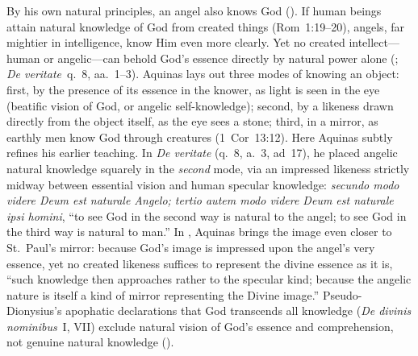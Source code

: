 By his own natural principles, an angel also knows God (). If human beings attain natural knowledge of God from created things (Rom~1:19--20), angels, far mightier in intelligence, know Him even more clearly. Yet no created intellect---human or angelic---can behold God's essence directly by natural power alone (; \emph{De veritate}~q.~8, aa.~1--3). Aquinas lays out three modes of knowing an object: first, by the presence of its essence in the knower, as light is seen in the eye (beatific vision of God, or angelic self-knowledge); second, by a likeness drawn directly from the object itself, as the eye sees a stone; third, in a mirror, as earthly men know God through creatures (1~Cor~13:12). Here Aquinas subtly refines his earlier teaching. In \emph{De veritate} (q.~8, a.~3, ad~17), he placed angelic natural knowledge squarely in the \emph{second} mode, via an impressed likeness strictly midway between essential vision and human specular knowledge: \emph{secundo modo videre Deum est naturale Angelo; tertio autem modo videre Deum est naturale ipsi homini}, ``to see God in the second way is natural to the angel; to see God in the third way is natural to man.'' In , Aquinas brings the image even closer to St.~Paul's mirror: because God's image is impressed upon the angel's very essence, yet no created likeness suffices to represent the divine essence as it is, ``such knowledge then approaches rather to the specular kind; because the angelic nature is itself a kind of mirror representing the Divine image.'' Pseudo-Dionysius's apophatic declarations that God transcends all knowledge (\emph{De divinis nominibus}~I, VII) exclude natural vision of God's essence and comprehension, not genuine natural knowledge ().


